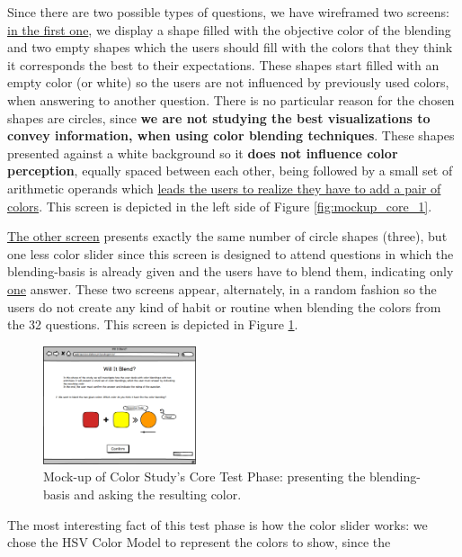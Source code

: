 %
Since there are two possible types of questions, we have wireframed two screens: \ul{in the first one}, we display a shape filled with the objective color of the
blending and two empty shapes which the users should fill with the colors that they think it corresponds the best to their expectations. These shapes start filled
with an empty color (or white) so the users are not influenced by previously used colors, when answering to another question. There is no particular reason for
the chosen shapes are circles, since \textbf{we are not studying the best visualizations to convey information, when using color blending techniques}. These
shapes presented against a white background so it \textbf{does not influence color perception}, equally spaced between each other, being followed by a small
set of arithmetic operands which \ul{leads the users to realize they have to add a pair of colors}. This screen is depicted in the left side of Figure
\ref{fig:mockup_core_1}. \par
%
\ul{The other screen} presents exactly the same number of circle shapes (three), but one less color slider since this screen is designed to attend questions in
which the blending-basis is already given and the users have to blend them, indicating only \ul{one} answer. These two screens appear, alternately, in a random
fashion so the users do not create any kind of habit or routine when blending the colors from the 32 questions. This screen is depicted in Figure
\ref{fig:mockup_core_2}. \par
%
\begin{figure}[htbp]
	\centering
  \includegraphics[width=0.4\textwidth]{images/implementation/mockup_core_twoColorsObj.png}
  \caption[Mock-up of Color Study's Core Test Phase: present the blending-basis and ask the result.]{Mock-up of Color Study's Core
	Test Phase: presenting the blending-basis and asking the resulting color.}
  \label{fig:mockup_core_2}
\end{figure} \par
%
The most interesting fact of this test phase is how the color slider works: we chose the HSV Color Model to represent the colors to show, since the
